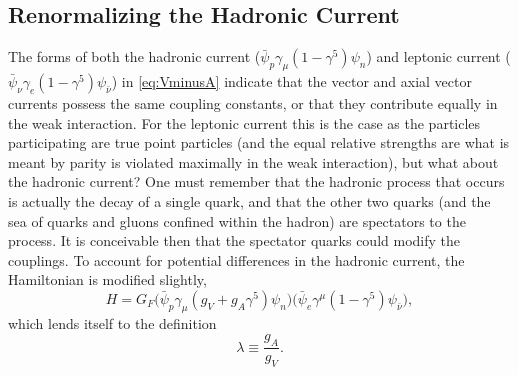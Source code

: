 
\subsection{Renormalizing the Hadronic Current}

The forms of both the hadronic current ($\bar{\psi}_p \gamma_\mu(1-\gamma^5)\psi_n$) and
leptonic current ($\bar{\psi}_\nu \gamma_e(1-\gamma^5)\psi_{\bar{\nu}}$) in \ref{eq:VminusA} indicate
that the vector and axial vector currents possess the same coupling constants, or that
they contribute equally in the weak interaction. For the leptonic current this is the case
as the particles participating are true point particles (and the equal relative strengths are
what is meant by parity is violated maximally in the weak interaction), but what about the
hadronic current? One must remember that the hadronic process that occurs is actually the decay
of a single quark, and that the other two quarks (and the sea of quarks and gluons confined within the hadron)
are spectators to the process.
It is conceivable then that the spectator quarks could modify the couplings.
To account for potential differences in the hadronic current, the
Hamiltonian is modified slightly,
%
\begin{equation} 
  H = G_F \Big(\bar{\psi}_p \gamma_\mu(g_V+g_A\gamma^5)\psi_n \Big)\Big(\bar{\psi}_{e} \gamma^\mu(1-\gamma^5)\psi_{\bar{\nu}} \Big),
  \label{eq:VminusA2}
\end{equation}
%
which lends itself to the definition
%
\begin{equation}
  \lambda \equiv \frac{g_A}{g_V}.
\end{equation}

